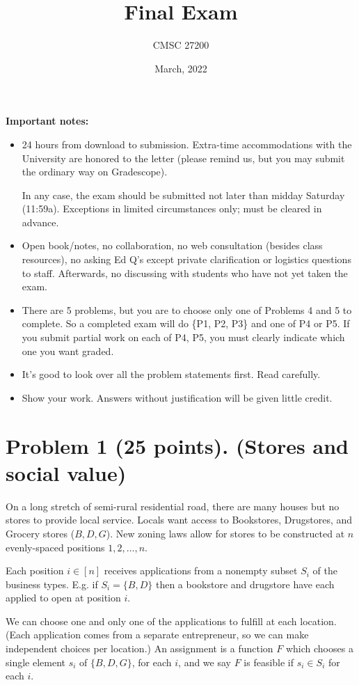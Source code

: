 \documentclass[12pt]{article}
\title{Final Exam}
\author{CMSC 27200}
\date{March, 2022}
\begin{document}
\maketitle

\noindent\textbf{Important notes:}
\begin{itemize}[leftmargin=*]
\item 24 hours from download to submission. Extra-time accommodations with the University are honored to the letter (please remind us, but you may submit the ordinary way on Gradescope).

In any case, the exam should be submitted not later than midday Saturday (11:59a). Exceptions in limited circumstances only; must be cleared in advance.
\item Open book/notes, no collaboration, no web consultation (besides class resources), no asking Ed Q's except private clarification or logistics questions to staff. Afterwards, no discussing with students who have not yet taken the exam.
\item There are 5 problems, but you are to choose only one of Problems 4 and 5 to complete. So a completed exam will do \{P1, P2, P3\} and one of P4 or P5. If you submit partial work on each of P4, P5, you must clearly indicate which one you want graded.
\item It's good to look over all the problem statements first. Read carefully.
\item Show your work. Answers without justification will be given little credit.
\end{itemize}

\newpage

\section*{Problem 1 (25 points). (Stores and social value)}

On a long stretch of semi-rural residential road, there are many houses but no stores to provide local service. Locals want access to Bookstores, Drugstores, and Grocery stores ($B,D,G$). New zoning laws allow for stores to be constructed at $n$ evenly-spaced positions $1,2,\ldots,n$.

Each position $i \in [n]$ receives applications from a nonempty subset $S_i$ of the business types. E.g. if $S_i = \{B,D\}$ then a bookstore and drugstore have each applied to open at position $i$.

We can choose one and only one of the applications to fulfill at each location. (Each application comes from a separate entrepreneur, so we can make independent choices per location.) An assignment is a function $F$ which chooses a single element $s_i$ of $\{B,D,G\}$, for each $i$, and we say $F$ is feasible if $s_i \in S_i$ for each $i$.
\end{document}
